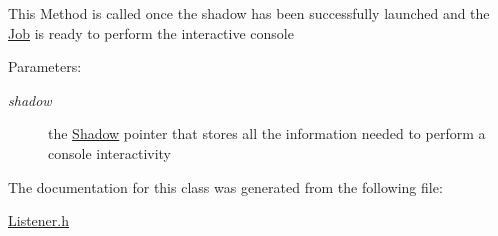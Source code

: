 This Method is called once the shadow has been successfully launched and the \hyperlink{classglite_1_1wmsui_1_1api_1_1Job}{Job} is ready to perform the interactive console \begin{Desc}
\item[Parameters:]
\begin{description}
\item[{\em shadow}]the \hyperlink{classglite_1_1wmsui_1_1api_1_1Shadow}{Shadow} pointer that stores all the information needed to perform a console interactivity\end{description}
\end{Desc}


The documentation for this class was generated from the following file:\begin{CompactItemize}
\item 
\hyperlink{Listener_8h}{Listener.h}\end{CompactItemize}
